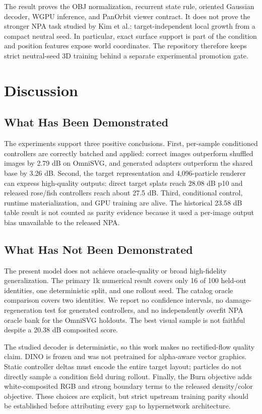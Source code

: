 \documentclass[sigconf,nonacm]{acmart}
\begin{document}
The result proves the OBJ normalization, recurrent state rule, oriented
Gaussian decoder, WGPU inference, and PanOrbit viewer contract. It does not
prove the stronger NPA task studied by Kim et al.: target-independent local
growth from a compact neutral seed. In particular, exact surface support is
part of the condition and position features expose world coordinates. The
repository therefore keeps strict neutral-seed 3D training behind a separate
experimental promotion gate.

\section{Discussion}

\subsection{What Has Been Demonstrated}

The experiments support three positive conclusions. First, per-sample
conditioned controllers are correctly batched and applied: correct images
outperform shuffled images by 2.79 dB on OmniSVG, and generated adapters
outperform the shared base by 3.26 dB. Second, the target representation and
4,096-particle renderer can express high-quality outputs: direct target splats
reach 28.08 dB p10 and released rose/fish controllers reach about 27.5 dB.
Third, conditional control, runtime materialization, and GPU training are
alive. The historical 23.58 dB table result is not counted as parity evidence
because it used a per-image output bias unavailable to the released NPA.

\subsection{What Has Not Been Demonstrated}

The present model does not achieve oracle-quality or broad high-fidelity
generalization. The primary 1k numerical result covers only 16 of 100 held-out
identities, one deterministic split, and one rollout seed. The catalog oracle
comparison covers two identities. We report no confidence intervals, no
damage-regeneration test for generated controllers, and no independently
overfit NPA oracle bank for the OmniSVG holdouts. The best visual sample is not
faithful despite a 20.38 dB composited score.

The studied decoder is deterministic, so this work makes no rectified-flow
quality claim. DINO is frozen and was not pretrained for alpha-aware vector
graphics. Static controller deltas must encode the entire target layout;
particles do not directly sample a condition field during rollout. Finally,
the Burn objective adds white-composited RGB and strong boundary terms to the
released density/color objective. These choices are explicit, but strict
upstream training parity should be established before attributing every gap to
hypernetwork architecture.
\end{document}
